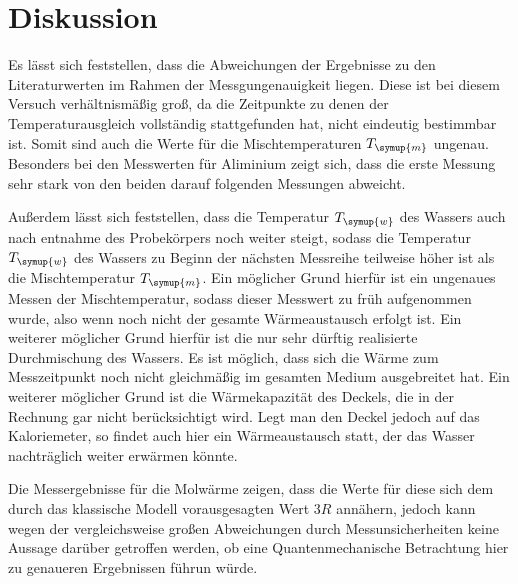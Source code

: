 \section{Diskussion}
\label{sec:Diskussion}

Es lässt sich feststellen, dass die Abweichungen der Ergebnisse zu den Literaturwerten
im Rahmen der Messgungenauigkeit liegen. Diese ist bei diesem Versuch verhältnismäßig groß,
da die Zeitpunkte zu denen der Temperaturausgleich vollständig stattgefunden hat, nicht
eindeutig bestimmbar ist. Somit sind auch die Werte für die Mischtemperaturen $T_{\symup{m}}$
ungenau. Besonders bei den Messwerten für Aliminium zeigt sich, dass die erste Messung
sehr stark von den beiden darauf folgenden Messungen abweicht.

Außerdem lässt sich feststellen, dass die Temperatur $T_{\symup{w}}$ des Wassers auch
nach entnahme des Probekörpers noch weiter steigt, sodass die Temperatur
$T_{\symup{w}}$ des Wassers zu Beginn der nächsten Messreihe teilweise höher ist
als die Mischtemperatur $T_{\symup{m}}$. Ein möglicher Grund hierfür ist ein ungenaues
Messen der Mischtemperatur, sodass dieser Messwert zu früh aufgenommen wurde, also wenn
noch nicht der gesamte Wärmeaustausch erfolgt ist. Ein weiterer möglicher Grund hierfür
ist die nur sehr dürftig realisierte Durchmischung des Wassers. Es ist möglich, dass
sich die Wärme zum Messzeitpunkt noch nicht gleichmäßig im gesamten Medium ausgebreitet hat.
Ein weiterer möglicher Grund ist die Wärmekapazität des Deckels, die in der Rechnung
gar nicht berücksichtigt wird. Legt man den Deckel jedoch auf das Kaloriemeter, so findet
auch hier ein Wärmeaustausch statt, der das Wasser nachträglich weiter erwärmen könnte.

Die Messergebnisse für die Molwärme zeigen, dass die Werte für diese sich dem durch
das klassische Modell vorausgesagten Wert $3R$ annähern, jedoch kann wegen der vergleichsweise
großen Abweichungen durch Messunsicherheiten keine Aussage darüber getroffen werden, ob
eine Quantenmechanische Betrachtung hier zu genaueren Ergebnissen führun würde.

